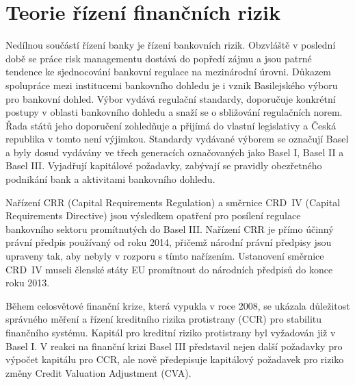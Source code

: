 \documentclass[a4paper,12pt]{report}
\theoremstyle{definition} \newtheorem{definice}[veta]{Definice}
\theoremstyle{remark}
\begin{document}
\chapter{Teorie řízení finančních rizik}


Nedílnou součástí řízení banky je řízení bankovních rizik.
Obzvláště v poslední době se práce risk managementu dostává do popředí zájmu
a jsou patrné tendence ke sjednocování bankovní regulace na mezinárodní úrovni.
Důkazem spolupráce mezi institucemi bankovního dohledu je i vznik Basilejského výboru pro bankovní dohled.
Výbor vydává regulační standardy, doporučuje konkrétní postupy v oblasti bankovního dohledu a snaží se o sbližování regulačních norem. 
Řada států jeho doporučení zohledňuje a přijímá do vlastní legislativy a Česká republika v tomto není výjimkou.
Standardy vydávané výborem se označují Basel a byly dosud vydávány ve třech generacích označovaných jako Basel I, Basel II a Basel III. 
Vyjadřují kapitálové požadavky, zabývají se pravidly obezřetného podnikání bank a aktivitami bankovního dohledu.


Nařízení CRR (Capital Requirements Regulation) \cite{EU2013} a
směrnice CRD~IV (Capital Requirements Directive) \cite{EU2013a}
jsou výsledkem opatření pro posílení regulace bankovního sektoru promítnutých do Basel III.
Nařízení CRR je přímo účinný právní předpis používaný od roku 2014, přičemž národní právní předpisy jsou upraveny tak, aby nebyly v rozporu s tímto nařízením. 
Ustanovení směrnice CRD~IV museli členské státy EU promítnout do národních předpisů do konce roku 2013.

Během celosvětové finanční krize, která vypukla v roce 2008, se ukázala důležitost správného měření a řízení kreditního rizika protistrany (CCR) pro stabilitu finančního systému.
Kapitál pro kreditní riziko protistrany byl vyžadován již v Basel I.  
V reakci na finanční krizi Basel III představil nejen další požadavky pro výpočet kapitálu pro CCR, ale nově
předepisuje kapitálový požadavek pro riziko změny Credit Valuation Adjustment (CVA). 
\end{document}
